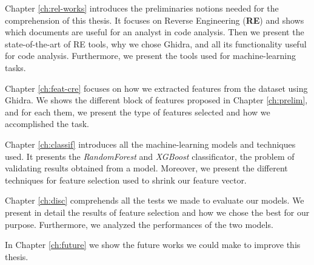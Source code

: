 Chapter \ref{ch:rel-works} introduces the preliminaries notions needed for the comprehension of this thesis. It focuses on Reverse Engineering (\textbf{RE}) and shows which documents are useful for an analyst in code analysis. Then we present the state-of-the-art of RE tools, why we chose Ghidra, and all its functionality useful for code analysis. Furthermore, we present the tools used for machine-learning tasks.

Chapter \ref{ch:feat-cre} focuses on how we extracted features from the dataset using Ghidra. We shows the different block of features proposed in Chapter \ref{ch:prelim}, and for each them, we present the type of features selected and how we accomplished the task.

Chapter \ref{ch:classif} introduces all the machine-learning models and techniques used. It presents the \textit{RandomForest} and \textit{XGBoost} classificator, the problem of validating results obtained from a model. Moreover, we present the different techniques for feature selection used to shrink our feature vector.

Chapter \ref{ch:disc} comprehends all the tests we made to evaluate our models. We present in detail the results of feature selection and how we chose the best for our purpose.
Furthermore, we analyzed the performances of the two models.

In Chapter \ref{ch:future} we show the future works we could make to improve this thesis. 